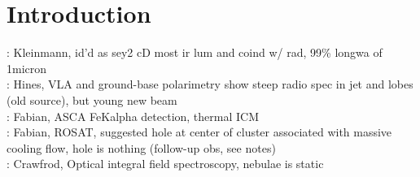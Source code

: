 \documentclass{emulateapj}
\begin{document}
\title{\mytitle}
\shorttitle{\mystitle}
\author{
  K. W. Cavagnolo,
  M. Donahue,
  B. R. McNamara,\\
  G. M. Voit,
  and M. Sun,
}
\journalinfo{}


\begin{abstract}
We report on the new \chandra\ X-ray Observations 
\end{abstract}



\section{Introduction}
\label{sec:intro}

\citet{1988ApJ...328..161K}: Kleinmann, id'd as sey2 cD most ir lum
and coind w/ rad, 99\% longwa of 1micron\\

\citet{1993ApJ...415...82H}: Hines, VLA and ground-base polarimetry
show steep radio spec in jet and lobes (old source), but young new
beam\\

\citet{1994ApJ...436L..51F}: Fabian, ASCA FeKalpha detection, thermal
ICM\\

\citet{1995MNRAS.274L..63F}: Fabian, ROSAT, suggested hole at center
of cluster associated with massive cooling flow, hole is nothing
(follow-up obs, see notes)\\

\citet{1996MNRAS.283.1003C}: Crawfrod, Optical integral field
spectroscopy, nebulae is static\\
\end{document}
